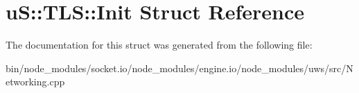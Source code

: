 \hypertarget{structu_s_1_1_t_l_s_1_1_init}{}\section{uS\+:\+:T\+LS\+:\+:Init Struct Reference}
\label{structu_s_1_1_t_l_s_1_1_init}


The documentation for this struct was generated from the following file\+:\begin{DoxyCompactItemize}
\item 
bin/node\+\_\+modules/socket.\+io/node\+\_\+modules/engine.\+io/node\+\_\+modules/uws/src/Networking.\+cpp\end{DoxyCompactItemize}
